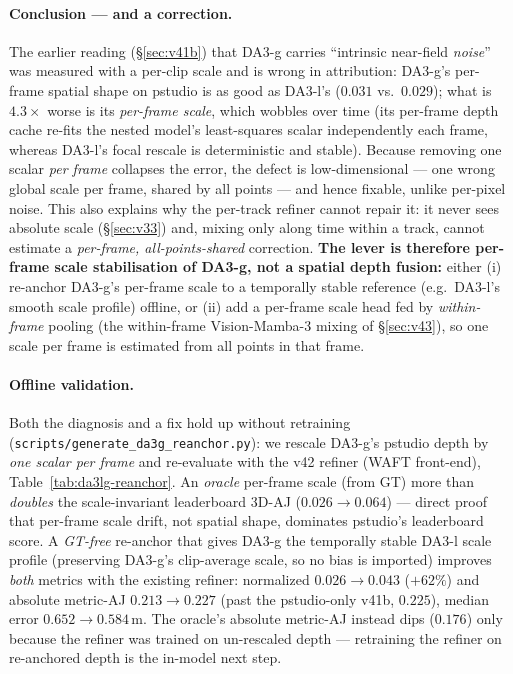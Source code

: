 \documentclass[11pt,a4paper]{article}
\begin{document}
\paragraph{Conclusion --- and a correction.}
The earlier reading (\S\ref{sec:v41b}) that DA3-g carries ``intrinsic near-field \emph{noise}'' was measured
with a per-clip scale and is wrong in attribution: DA3-g's per-frame spatial shape on pstudio is as good as
DA3-l's ($0.031$ vs.\ $0.029$); what is $4.3\times$ worse is its \emph{per-frame scale}, which wobbles over
time (its per-frame depth cache re-fits the nested model's least-squares scalar independently each frame,
whereas DA3-l's focal rescale is deterministic and stable). Because removing one scalar \emph{per frame}
collapses the error, the defect is low-dimensional --- one wrong global scale per frame, shared by all
points --- and hence fixable, unlike per-pixel noise. This also explains why the per-track refiner cannot
repair it: it never sees absolute scale (\S\ref{sec:v33}) and, mixing only along time within a track, cannot
estimate a \emph{per-frame, all-points-shared} correction. \textbf{The lever is therefore per-frame scale
stabilisation of DA3-g, not a spatial depth fusion:} either (i) re-anchor DA3-g's per-frame scale to a
temporally stable reference (e.g.\ DA3-l's smooth scale profile) offline, or (ii) add a per-frame scale head
fed by \emph{within-frame} pooling (the within-frame Vision-Mamba-3 mixing of \S\ref{sec:v43}), so one scale
per frame is estimated from all points in that frame.

\paragraph{Offline validation.}
Both the diagnosis and a fix hold up without retraining (\texttt{scripts/generate\_da3g\_reanchor.py}):
we rescale DA3-g's pstudio depth by \emph{one scalar per frame} and re-evaluate with the v42 refiner
(WAFT front-end), Table~\ref{tab:da3lg-reanchor}. An \emph{oracle} per-frame scale (from GT) more than
\emph{doubles} the scale-invariant leaderboard 3D-AJ ($0.026\!\to\!0.064$) --- direct proof that per-frame
scale drift, not spatial shape, dominates pstudio's leaderboard score. A \emph{GT-free} re-anchor that gives
DA3-g the temporally stable DA3-l scale profile (preserving DA3-g's clip-average scale, so no bias is
imported) improves \emph{both} metrics with the existing refiner: normalized $0.026\!\to\!0.043$ ($+62\%$)
and absolute metric-AJ $0.213\!\to\!0.227$ (past the pstudio-only v41b, $0.225$), median error
$0.652\!\to\!0.584$\,m. The oracle's absolute metric-AJ instead dips ($0.176$) only because the refiner was
trained on un-rescaled depth --- retraining the refiner on re-anchored depth is the in-model next step.
\end{document}
